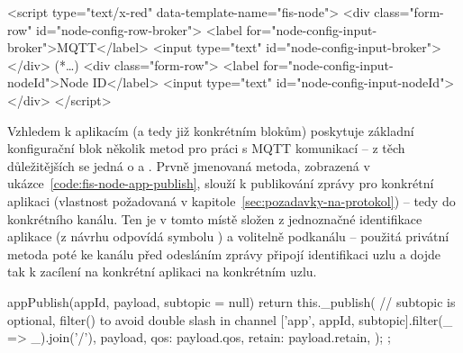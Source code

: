 \begin{code}[
    language=HTML,
    label=code:fis-node-template,
    caption={Ukázka z implementace druhé povinné části deklarace bloku -- šablona formuláře v jazyce HTML obsahuje
    jednotlivé vstupní pro pole pro korespondující parametry definovené v registraci bloku do editoru
    v ukázce~\ref{code:fis-node-constructor}.
    Atribut \ic{id="node-config-input-broker"} (a odpovídající) jsou důležité vzhledem k chování editoru, nutná je shoda
    s názvem parametru při registraci bloku -- stejně jako správné spárování šablony pomocí atributu
    \ic{data-template-name="fis-node"}.},
]
<script type="text/x-red" data-template-name="fis-node">
    <div class="form-row" id="node-config-row-broker">
        <label for="node-config-input-broker">MQTT</label>
        <input type="text" id="node-config-input-broker">
    </div>
    (*\ldots*)
    <div class="form-row">
        <label for="node-config-input-nodeId">Node ID</label>
        <input type="text" id="node-config-input-nodeId">
    </div>
</script>
\end{code}

Vzhledem k aplikacím (a tedy již konkrétním blokům) poskytuje základní konfigurační blok několik metod pro práci s
MQTT komunikací -- z těch důležitějších se jedná o  a .
Prvně jmenovaná metoda, zobrazená v ukázce~\ref{code:fis-node-app-publish}, slouží k publikování zprávy pro
konkrétní aplikaci (vlastnost požadovaná v kapitole~\ref{sec:pozadavky-na-protokol}) -- tedy do konkrétního kanálu.
Ten je v tomto místě složen z jednoznačné identifikace aplikace  (z návrhu odpovídá symbolu ) a
volitelně podkanálu -- použitá privátní metoda  poté ke kanálu před odesláním zprávy připojí identifikaci
uzlu a dojde tak k zacílení na konkrétní aplikaci na konkrétním uzlu.

\begin{code}[
    language=Javascript,
    label=code:fis-node-app-publish,
    caption={Detail z implementace třídy \ic{FisNode} -- metoda \ic{appPublish} poskytuje možnost konkrétnímu bloku
    odeslání zprávy do odpovídající aplikace na uzlu.}
]
appPublish(appId, payload, subtopic = null) {
    return this._publish(
        // subtopic is optional, filter() to avoid double slash in channel
        ['app', appId, subtopic].filter(_ => _).join('/'),
        {
            payload,
            qos: payload.qos,
            retain: payload.retain,
        }
    );
};
\end{code}


